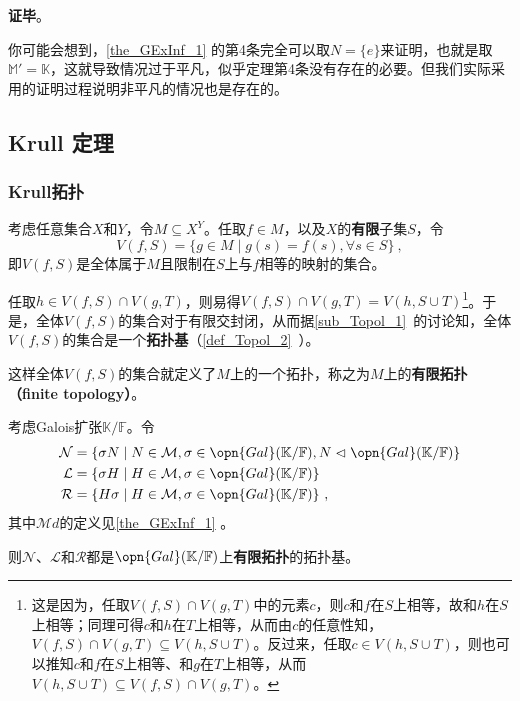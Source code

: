 \textbf{证毕}。

你可能会想到，\autoref{the_GExInf_1} 的第4条完全可以取$N=\{e\}$来证明，也就是取$\mathbb{M}'=\mathbb{K}$，这就导致情况过于平凡，似乎定理第4条没有存在的必要。但我们实际采用的证明过程说明非平凡的情况也是存在的。





\subsection{Krull 定理}\label{sub_GExInf_1}


\subsubsection{Krull拓扑}

考虑任意集合$X$和$Y$，令$M\subseteq X^Y$。任取$f\in M$，以及$X$的\textbf{有限}子集$S$，令
\begin{equation}
V(f, S) = \{g\in M\mid g(s)=f(s), \forall s\in S\}~,
\end{equation}
即$V(f, S)$是全体属于$M$且限制在$S$上与$f$相等的映射的集合。

任取$h\in V(f, S)\cap V(g, T)$，则易得$V(f, S)\cap V(g, T) = V(h, S\cup T)$\footnote{这是因为，任取$V(f, S)\cap V(g, T)$中的元素$c$，则$c$和$f$在$S$上相等，故和$h$在$S$上相等；同理可得$c$和$h$在$T$上相等，从而由$c$的任意性知，$V(f, S)\cap V(g, T)\subseteq V(h, S\cup T)$。反过来，任取$c\in V(h, S\cup T)$，则也可以推知$c$和$f$在$S$上相等、和$g$在$T$上相等，从而$V(h, S\cup T)\subseteq V(f, S)\cap V(g, T)$。}。于是，全体$V(f, S)$的集合对于有限交封闭，从而据\autoref{sub_Topol_1}~的讨论知，全体$V(f, S)$的集合是一个\textbf{拓扑基}（\autoref{def_Topol_2}~）。

这样全体$V(f, S)$的集合就定义了$M$上的一个拓扑，称之为$M$上的\textbf{有限拓扑（finite topology）}。



\begin{theorem}{}\label{the_GExInf_2}
考虑Galois扩张$\mathbb{K}/\mathbb{F}$。令
\begin{equation}\label{eq_GExInf_1}
\begin{aligned}
\mathcal{N} &= \{\sigma N\mid N\in\mathcal{M}, \sigma\in\opn{Gal}(\mathbb{K}/\mathbb{F}), N\vartriangleleft\opn{Gal}(\mathbb{K}/\mathbb{F})\}\\
\mathcal{L} &= \{\sigma H\mid H\in\mathcal{M}, \sigma\in\opn{Gal}(\mathbb{K}/\mathbb{F})\}\\
\mathcal{R} &= \{H\sigma \mid H\in\mathcal{M}, \sigma\in\opn{Gal}(\mathbb{K}/\mathbb{F})\}~,
\end{aligned}
\end{equation}
其中$\mathcal{M}d$的定义见\autoref{the_GExInf_1} 。

则$\mathcal{N}$、$\mathcal{L}$和$\mathcal{R}$都是$\opn{Gal}(\mathbb{K}/\mathbb{F})$上\textbf{有限拓扑}的拓扑基。
\end{theorem}

